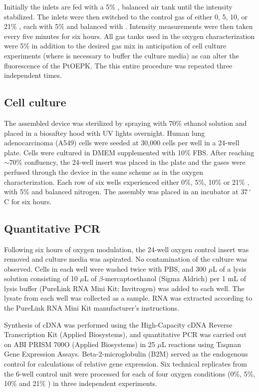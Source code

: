 \documentclass[10pt,letterpaper]{article}
\begin{document}
Initially the inlets are fed with a 5\% , balanced air tank until the intensity stabilized.
The inlets were then switched to the control gas of either 0, 5, 10, or 21\% , each with 5\%  and balanced with .
Intensity measurements were then taken every five minutes for six hours.
All gas tanks used in the oxygen characterization were 5\%   in addition to the desired gas mix in anticipation of cell culture experiments (where  is necessary to buffer the culture media) as  can alter the fluorescence of the PtOEPK.
The this entire procedure was repeated three independent times. 

\subsection*{Cell culture}

The assembled device was sterilized by spraying with 70\% ethanol solution and placed in a biosaftey hood with UV lights overnight.
Human lung adenocarcinoma (A549) cells were seeded at 30,000 cells per well in a 24-well plate.
Cells were cultured in DMEM supplemented with 10\% FBS.
After reaching $\sim$70\% confluency, the 24-well insert was placed in the plate and the gases were perfused through the device in the same scheme as in the oxygen characterization.
Each row of six wells experienced either 0\%, 5\%, 10\% or 21\% , with 5\%  and balanced nitrogen.
The assembly was placed in an incubator at $37\,^{\circ}$C for six hours. 


\subsection*{Quantitative PCR}

Following six hours of oxygen modulation, the 24-well oxygen control insert was removed and culture media was aspirated.
No contamination of the culture was observed.
Cells in each well were washed twice with PBS, and 300 $\mu$L of a lysis solution consisting of 10 $\mu$L of $\beta$-mercaptoethanol (Sigma Aldrich) per 1 mL of lysis buffer (PureLink RNA Mini Kit; Invitrogen) was added to each well.
The lysate from each well was collected as a sample.
RNA was extracted according to the PureLink RNA Mini Kit manufacturer’s instructions.

Synthesis of cDNA was performed using the High-Capacity cDNA Reverse Transcription Kit (Applied Biosystems), and quantitative PCR was carried out on ABI PRISM 700O (Applied Biosystems) in 25 $\mu$L reactions using Taqman Gene Expression Assays.
Beta-2-microglobulin (B2M) served as the endogenous control for calculations of relative gene expression.
Six technical replicates from the 6-well control unit were processed for each of four oxygen conditions (0\%, 5\%, 10\% and 21\% ) in three independent experiments.
\end{document}
